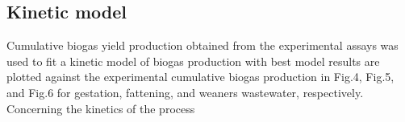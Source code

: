 \subsection{Kinetic model}
Cumulative biogas yield production obtained from the experimental assays was used to fit a kinetic model of biogas production  with best model results are plotted against the experimental cumulative biogas production in Fig.4, Fig.5, and Fig.6 for gestation, fattening, and weaners wastewater, respectively.
Concerning the kinetics of the process
